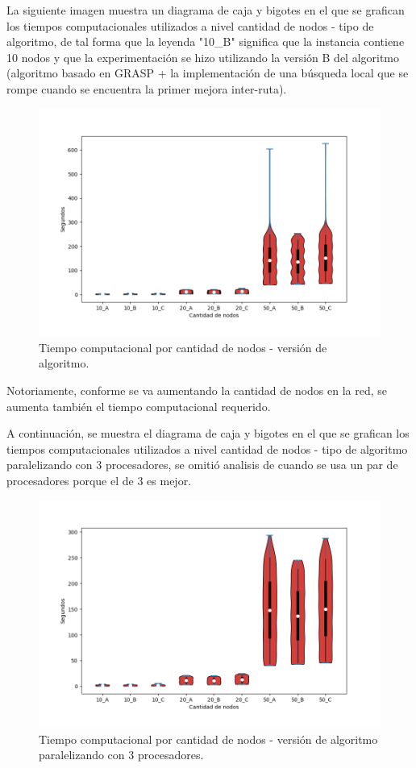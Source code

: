 \documentclass[review]{elsarticle}
\begin{document}
La siguiente imagen muestra un diagrama de caja y bigotes en el que se grafican los tiempos computacionales utilizados a nivel cantidad de nodos - tipo de algoritmo, de tal forma que la leyenda "10\_B" significa que la instancia contiene 10 nodos y que la experimentación se hizo utilizando la versión B del algoritmo (algoritmo basado en GRASP + la implementación de una búsqueda local que se rompe cuando se encuentra la primer mejora inter-ruta).

	 \begin{figure}[h!]
	\centering
	\includegraphics[width=0.7\linewidth]{tiempos.png}
	\caption{Tiempo computacional por cantidad de nodos - versión de algoritmo.}
	\label{fig:imagen1}
	
	\end{figure}

Notoriamente, conforme se va aumentando la cantidad de nodos en la red, se aumenta también el tiempo computacional requerido. 

A continuación, se muestra el diagrama de caja y bigotes en el que se grafican los tiempos computacionales utilizados a nivel cantidad de nodos - tipo de algoritmo paralelizando con 3 procesadores, se omitió analisis de cuando se usa un par de procesadores porque el de 3 es mejor.


	 \begin{figure}[h!]
	\centering
	\includegraphics[width=0.7\linewidth]{3tiempos.png}
	\caption{Tiempo computacional por cantidad de nodos - versión de algoritmo paralelizando con 3 procesadores.}
	\label{fig:imagen2}
	
	\end{figure}
\end{document}
